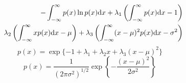 \begin{eqnarray*}
&&-\int_{-\infty}^{\infty} p(x)\ln p(x) {\rm d}x + \lambda _1 \left( \int_{-\infty}^{\infty} p(x){\rm d}x - 1 \right) \\
&&\lambda _2 \left( \int_{-\infty}^{\infty} xp(x){\rm d}x - \mu \right)  + \lambda _3 \left( \int_{-\infty}^{\infty} (x-\mu)^2 p(x){\rm d}x - \sigma ^2 \right)
\end{eqnarray*}
\begin{equation*}
 p(x) = \exp \{-1 + \lambda _1 + \lambda _2 x + \lambda _3 (x-\mu) ^2\}
\end{equation*}
\begin{equation*}
p(x) = \frac{1}{(2\pi \sigma^2)^{1/2}} \exp \left\{ - \frac{(x-\mu)^2}{2\sigma ^2} \right\}
\end{equation*}
